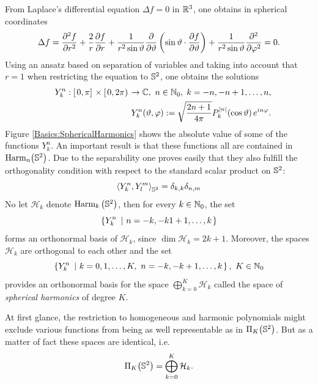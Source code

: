 From Laplace's differential equation $\Delta f = 0$ in $\mathbb{R}^3$, one obtains in spherical coordinates
\begin{equation}
  \label{SphericalHarmonics.LaplaceEquation.SphericalCoordinates}
  \Delta f = \frac{\partial^2 f}{\partial r^2} + \frac{2}{r}\frac{\partial f}{\partial
  r} + \frac{1}{r^2 \sin \vartheta}\frac{\partial}{\partial \vartheta}\left(\sin \vartheta \cdot \frac{\partial f}{\partial
  \vartheta}\right) + \frac{1}{r^2 \sin \vartheta}\frac{\partial^2}{\partial \varphi^2} = 0.
\end{equation}
Using an ansatz based on separation of variables and taking into account that $r = 1$ when restricting the 
equation to $\mathbb{S}^2$, one obtains the solutions
\begin{eqnarray*}
    & & Y_{k}^n: \left[\left.0,\pi\right]\right.\times\left[\left.0,2\pi\right)\right. \rightarrow
    \mathbb{C},\ n \in \mathbb{N}_{0},\; k = -n,-n+1,\ldots,n,\\
    & & Y_{k}^n{\hspace{-0.4ex}}\left(\vartheta,\varphi\right) := \sqrt{\frac{2n+1}{4\pi}} 
    P_{k}^{\left\vert n\right\vert}{\hspace{-0.4ex}}\left(\cos \vartheta\right) e^{in\varphi}.
\end{eqnarray*}
Figure \ref{Basics:SphericalHarmonics} shows the absolute value of some of the 
functions $Y_{k}^{n}$. An important result is that these functions all are contained in $\text{Harm}_n{\hspace{-0.4ex}}\left(\mathbb{S}^2\right)$.
Due to the separability one proves easily that they also fulfill the orthogonality condition with respect 
to the standard scalar product on $\mathbb{S}^2$:
\begin{equation}
  \nonumber
  \left<Y_{k}^n,Y_{l}^m\right>_{\mathbb{S}^2} = \delta_{k,k} \delta_{n,m}
\end{equation}
No let $\mathcal{H}_k$ denote
$\text{Harm}_k\left(\mathbb{S}^2\right)$, then
for every $k \in \mathbb{N}_{0}$, the set
\begin{equation}
  \nonumber
  \left\{Y_{k}^n\ \left|\ n = -k,-k1+1,\ldots,k\right.\right\rbrace
\end{equation}
forms an orthonormal basis of $\mathcal{H}_k$, since $\dim \mathcal{H}_k =
2k+1$. Moreover, the spaces $\mathcal{H}_k$ are orthogonal
to each other and the set 
$$\left\{Y_{k}^n\ \left|\ k = 0,1,\ldots,K,\ n = -k,-k+1,\ldots,k\right.\right\rbrace,\ K \in \mathbb{N}_{0}$$ 
provides an orthonormal basis for the space $\bigoplus_{k=0}^{K}\mathcal{H}_k$ called
the space of \emph{spherical harmonics} of degree $K$.

At first glance, the restriction to homogeneous and harmonic polynomials
might exclude various functions from being as well representable
as in $\Pi_K{\hspace{-0.4ex}}\left(\mathbb{S}^2\right)$. But as a matter of fact these
spaces are identical, i.e. 
\begin{equation}
  \nonumber
    \Pi_K{\hspace{-0.4ex}}\left(\mathbb{S}^2\right) = \bigoplus_{k=0}^{K}\mathcal{H}_k.
\end{equation}

